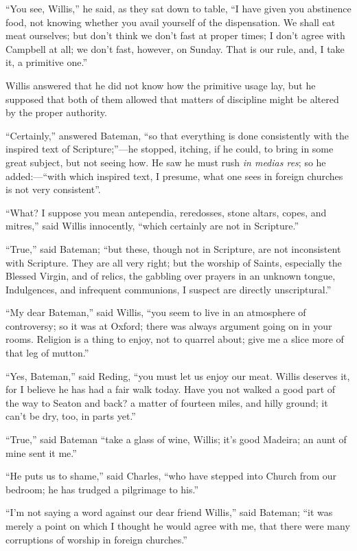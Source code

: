 ``You see, Willis,'' he said, as they sat down to table,
``I have given you abstinence food, not knowing whether you avail
yourself of the dispensation. We shall eat meat ourselves; but don't
think we don't fast at proper times; I don't agree with Campbell at
all; we don't fast, however, on Sunday. That is our rule, and, I take
it, a primitive one.''

Willis answered that he did not know how the primitive usage lay,
but he supposed that both of them allowed that matters of discipline
might be altered by the proper authority.

``Certainly,'' answered Bateman, ``so that everything
is done consistently with the inspired text of Scripture;''—he
stopped, itching, if he could, to bring in some great subject, but not
seeing how. He saw he must rush \emph{in medias res}; so he added:—``with
which inspired text, I presume, what one sees in foreign
churches is not very consistent''.

``What? I suppose you mean antependia, reredosses, stone
altars, copes, and mitres,'' said Willis innocently, ``which
certainly are not in Scripture.''

``True,'' said Bateman; ``but these, though not in
Scripture, are not inconsistent with Scripture. They are all very
right; but the worship of Saints, especially the Blessed Virgin, and
of relics, the gabbling over prayers in an unknown tongue,
Indulgences, and infrequent communions, I suspect are directly
unscriptural.''

``My dear Bateman,'' said Willis, ``you seem to live in
an atmosphere of controversy; so it was at Oxford; there was always
argument going on in your rooms. Religion is a thing to enjoy, not to
quarrel about; give me a slice more of that leg of mutton.''

``Yes, Bateman,'' said Reding, ``you must let us enjoy
our meat. Willis deserves it, for I believe he has had a fair walk
today. Have you not walked a good part of the way to Seaton and back?
a matter of fourteen miles, and hilly ground; it can't be dry, too, in
parts yet.''

``True,'' said Bateman ``take a glass of wine, Willis;
it's good Madeira; an aunt of mine sent it me.''

``He puts us to shame,'' said Charles, ``who have
stepped into Church from our bedroom; he has trudged a pilgrimage to
his.''

``I'm not saying a word against our dear friend Willis,''
said Bateman; ``it was merely a point on which I thought he
would agree with me, that there were many corruptions of worship in
foreign churches.''

